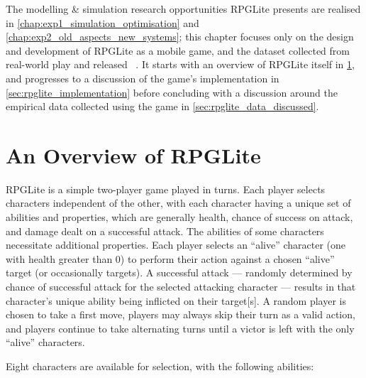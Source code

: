 The modelling \& simulation
research opportunities RPGLite presents are realised in
\cref{chap:exp1_simulation_optimisation} and
\cref{chap:exp2_old_aspects_new_systems}; this chapter focuses only on the
design and development of RPGLite as a mobile game, and the dataset collected
from real-world play and released
~\cite{RPGLiteLessonsLearned}. It starts with an overview of
RPGLite itself in \cref{sec:rpglite_overview}, and progresses to a discussion of
the game's implementation in \cref{sec:rpglite_implementation} before concluding
with a discussion around the empirical data collected using the game in
\cref{sec:rpglite_data_discussed}.

\section{An Overview of RPGLite}\label{sec:rpglite_overview}

RPGLite is a simple two-player game played in turns. Each player selects
characters independent of the other, with each character having a unique set of
abilities and properties, which are generally health, chance of success on
attack, and damage dealt on a successful attack. The abilities of some
characters necessitate additional properties. Each player selects an ``alive''
character (one with health greater than 0) to perform their action against a
chosen ``alive'' target (or occasionally targets). A successful attack ---
randomly determined by chance of successful attack for the selected attacking
character --- results in that character's unique ability being inflicted on
their target[s]. A random player is chosen to take a first move, players may
always skip their turn as a valid action, and players continue to take
alternating turns until a victor is left with the only ``alive'' characters.

Eight characters are available for selection, with the following
abilities:

